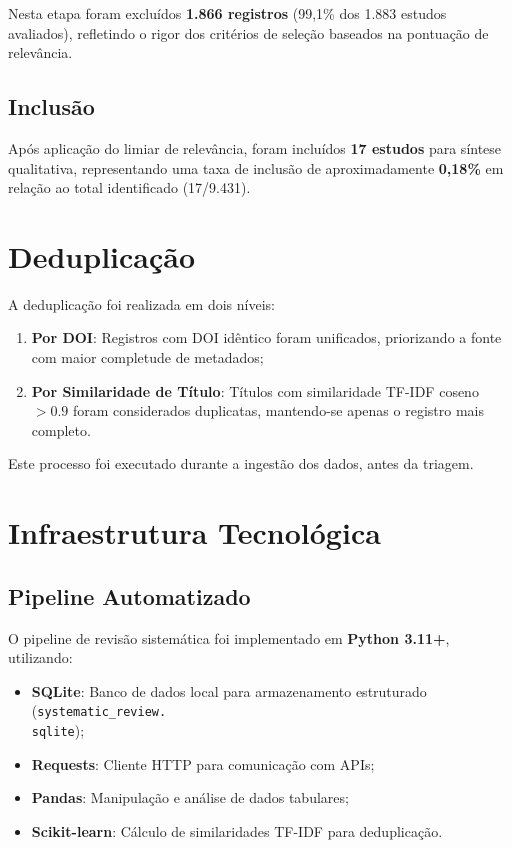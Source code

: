 Nesta etapa foram excluídos \textbf{1.866 registros} (99,1\% dos 1.883 estudos avaliados), refletindo o rigor dos critérios de seleção baseados na pontuação de relevância.

\subsection{Inclusão}

Após aplicação do limiar de relevância, foram incluídos \textbf{17 estudos} para síntese qualitativa, representando uma taxa de inclusão de aproximadamente \textbf{0,18\%} em relação ao total identificado (17/9.431).

\section{Deduplicação}

A deduplicação foi realizada em dois níveis:

\begin{enumerate}
    \item \textbf{Por DOI}: Registros com DOI idêntico foram unificados, priorizando a fonte com maior completude de metadados;
    \item \textbf{Por Similaridade de Título}: Títulos com similaridade TF-IDF coseno $>0.9$ foram considerados duplicatas, mantendo-se apenas o registro mais completo.
\end{enumerate}

Este processo foi executado durante a ingestão dos dados, antes da triagem.

\section{Infraestrutura Tecnológica}

\subsection{Pipeline Automatizado}

O pipeline de revisão sistemática foi implementado em \textbf{Python 3.11+}, utilizando:

\begin{itemize}
    \item \textbf{SQLite}: Banco de dados local para armazenamento estruturado (\texttt{systematic\_review.\\sqlite});
    \item \textbf{Requests}: Cliente HTTP para comunicação com APIs;
    \item \textbf{Pandas}: Manipulação e análise de dados tabulares;
    \item \textbf{Scikit-learn}: Cálculo de similaridades TF-IDF para deduplicação.
\end{itemize}

